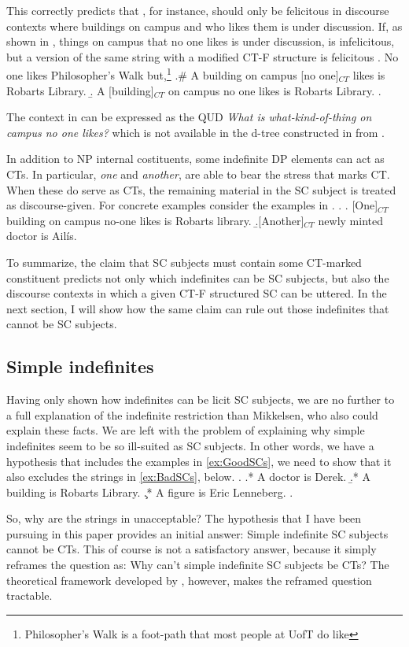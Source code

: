 \documentclass[GPFinal]{subfiles}
\begin{document}
This correctly predicts that \LLast[b], for instance, should only be felicitous in discourse contexts where buildings on campus and who likes them is under discussion.
If, as shown in \Next, things on campus that no one likes is under discussion, \LLast[b] is infelicitous, but a version of the same string with a modified CT-F structure is felicitous
\ex. No one likes Philosopher's Walk but,\footnote{Philosopher's Walk is a foot-path that most people at UofT do like}
\a.\# A building on campus [no one]$_{CT}$ likes is Robarts Library.
\b. A [building]$_{CT}$ on campus no one likes is Robarts Library.
\z.

The context in \Last can be expressed as the QUD \textit{What is what-kind-of-thing on campus no one likes?} which is not available in the d-tree constructed in \LLast from \Last[a].

In addition to NP internal costituents, some indefinite DP elements can act as CTs.
In particular, \textit{one} and \textit{another}, are able to bear the stress that marks CT.
When these do serve as CTs, the remaining material in the SC subject is treated as discourse-given.
For concrete examples consider the examples in \Next.
\ex.
\a.\label{ex:One} [One]$_{CT}$ building on campus no-one likes is Robarts library.
\b.\label{ex:Another}[Another]$_{CT}$ newly minted doctor is Ail\'is.

To summarize, the claim that SC subjects must contain some CT-marked constituent predicts not only which indefinites can be SC subjects, but also the discourse contexts in which a given CT-F structured SC can be uttered.
In the next section, I will show how the same claim can rule out those indefinites that cannot be SC subjects.
\subsection{Simple indefinites}
Having only shown how indefinites can be licit SC subjects, we are no further to a full explanation of the indefinite restriction than Mikkelsen, who also could explain these facts.
We are left with the problem of explaining why simple indefinites seem to be so ill-suited as SC subjects.
In other words, we have a hypothesis that includes the examples in \ref{ex:GoodSCs}, we need to show that it also excludes the strings in \ref{ex:BadSCs}, below.
\ex.\label{ex:BadSCs}
\a.* A doctor is Derek.
\b.* A building is Robarts Library.
\c.* A figure is Eric Lenneberg.
\z.

So, why are the strings in \Last unacceptable?
The hypothesis that I have been pursuing in this paper provides an initial answer: Simple indefinite SC subjects cannot be CTs.
This of course is not a satisfactory answer, because it simply reframes the question as: Why can't simple indefinite SC subjects be CTs?
The theoretical framework developed by \textcite{rooth1992theory,roberts2012information,buring2003d,buringforthcomingtopic}, however, makes the reframed question tractable.
\end{document}
